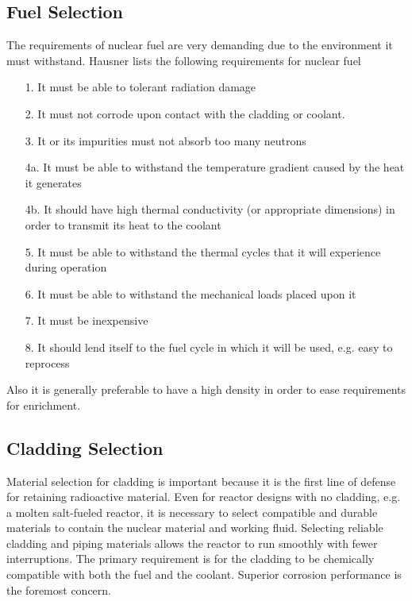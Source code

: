 
\subsection{Fuel Selection}
The requirements of nuclear fuel are very demanding due to the environment it must withstand. Hausner \cite{Hausner}
lists the following requirements for nuclear fuel
\begin{itemize}
\item[1.] It must be able to tolerant radiation damage
\item[2.] It must not corrode upon contact with the cladding or coolant.
\item[3.] It or its impurities must not absorb too many neutrons
\item[4a.] It must be able to withstand the temperature gradient caused by the heat it generates
\item[4b.] It should have high thermal conductivity (or appropriate dimensions) in order to transmit its heat to the coolant
\item[5.] It must be able to withstand the thermal cycles that it will experience during operation
\item[6.] It must be able to withstand the mechanical loads placed upon it
\item[7.] It must be inexpensive
\item[8.] It should lend itself to the fuel cycle in which it will be used, e.g. easy to reprocess
\end{itemize} 

Also it is generally preferable to have a high density in order to ease requirements for enrichment.

\subsection{Cladding Selection}
Material selection for cladding is important because it is the first line of defense for retaining radioactive material.
Even for reactor designs with no cladding, e.g. a molten salt-fueled reactor, it is necessary to select compatible and durable materials to contain the nuclear material and working fluid.
Selecting reliable cladding and piping materials allows the reactor to run smoothly with fewer interruptions. The primary requirement is for the cladding to be chemically compatible with both the fuel and the coolant. Superior corrosion performance is the foremost concern.

